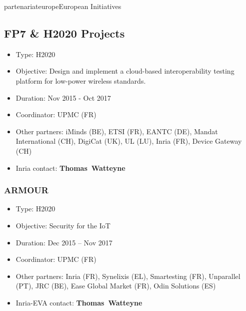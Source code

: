 \documentclass{ra2016}
\newcommand{\thomas}  {\textbf{Thomas~Watteyne}}
\begin{document}

\begin{module}{partenariat}{europe}{European Initiatives}


\subsection{FP7 \& H2020 Projects}
\begin{itemize}
    \item Type: H2020
    \item Objective: Design and implement a cloud-based interoperability testing platform for low-power wireless standards.
    \item Duration: Nov 2015 - Oct 2017
    \item Coordinator: UPMC (FR)
    \item Other partners: iMinds (BE), ETSI (FR), EANTC (DE), Mandat International (CH), DigiCat (UK), UL (LU), Inria (FR), Device Gateway (CH)
    \item Inria contact: \thomas
\end{itemize}

\subsubsection{ARMOUR}

\begin{itemize}
    \item Type: H2020
    \item Objective: Security for the IoT
    \item Duration: Dec 2015 – Nov 2017
    \item Coordinator: UPMC (FR)
    \item Other partners: Inria (FR), Synelixis (EL), Smartesting (FR), Unparallel (PT), JRC (BE), Ease Global Market (FR), Odin Solutions (ES)
    \item Inria-EVA contact: \thomas
\end{itemize}


\end{module}
\end{document}
